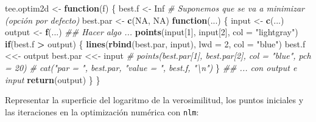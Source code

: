 \documentclass[
]{book}
\newenvironment{Shaded}{\begin{snugshade}}{\end{snugshade}}
\newcommand{\CommentTok}[1]{\textcolor[rgb]{0.56,0.35,0.01}{\textit{#1}}}
\newcommand{\ControlFlowTok}[1]{\textcolor[rgb]{0.13,0.29,0.53}{\textbf{#1}}}
\newcommand{\DataTypeTok}[1]{\textcolor[rgb]{0.13,0.29,0.53}{#1}}
\newcommand{\DecValTok}[1]{\textcolor[rgb]{0.00,0.00,0.81}{#1}}
\newcommand{\KeywordTok}[1]{\textcolor[rgb]{0.13,0.29,0.53}{\textbf{#1}}}
\newcommand{\NormalTok}[1]{#1}
\newcommand{\OperatorTok}[1]{\textcolor[rgb]{0.81,0.36,0.00}{\textbf{#1}}}
\newcommand{\OtherTok}[1]{\textcolor[rgb]{0.56,0.35,0.01}{#1}}
\newcommand{\StringTok}[1]{\textcolor[rgb]{0.31,0.60,0.02}{#1}}
\theoremstyle{break}
\theoremstyle{definition}
\theoremstyle{definition}
\theoremstyle{definition}
\theoremstyle{remark}
\begin{document}
\begin{Shaded}
\begin{Highlighting}[]
\NormalTok{tee.optim2d <-}\StringTok{ }\ControlFlowTok{function}\NormalTok{(f) \{}
\NormalTok{  best.f <-}\StringTok{ }\OtherTok{Inf}   \CommentTok{# Suponemos que se va a minimizar (opción por defecto)}
\NormalTok{  best.par <-}\StringTok{ }\KeywordTok{c}\NormalTok{(}\OtherTok{NA}\NormalTok{, }\OtherTok{NA}\NormalTok{)   }
  \ControlFlowTok{function}\NormalTok{(...) \{}
\NormalTok{    input <-}\StringTok{ }\KeywordTok{c}\NormalTok{(...)}
\NormalTok{    output <-}\StringTok{ }\KeywordTok{f}\NormalTok{(...)}
    \CommentTok{## Hacer algo ...}
    \KeywordTok{points}\NormalTok{(input[}\DecValTok{1}\NormalTok{], input[}\DecValTok{2}\NormalTok{], }\DataTypeTok{col =} \StringTok{"lightgray"}\NormalTok{)}
    \ControlFlowTok{if}\NormalTok{(best.f }\OperatorTok{>}\StringTok{ }\NormalTok{output) \{}
      \KeywordTok{lines}\NormalTok{(}\KeywordTok{rbind}\NormalTok{(best.par, input), }\DataTypeTok{lwd =} \DecValTok{2}\NormalTok{, }\DataTypeTok{col =} \StringTok{"blue"}\NormalTok{)}
\NormalTok{      best.f <<-}\StringTok{ }\NormalTok{output}
\NormalTok{      best.par <<-}\StringTok{ }\NormalTok{input}
      \CommentTok{# points(best.par[1], best.par[2], col = "blue", pch = 20)}
      \CommentTok{# cat("par = ", best.par, "value = ", best.f, "\textbackslash{}n")}
\NormalTok{    \} }
    \CommentTok{## ... con output e input}
    \KeywordTok{return}\NormalTok{(output)}
\NormalTok{  \}}
\NormalTok{\}}
\end{Highlighting}
\end{Shaded}

Representar la superficie del logaritmo de la verosimilitud,
los puntos iniciales y las iteraciones en la optimización numérica con \texttt{nlm}:
\end{document}
